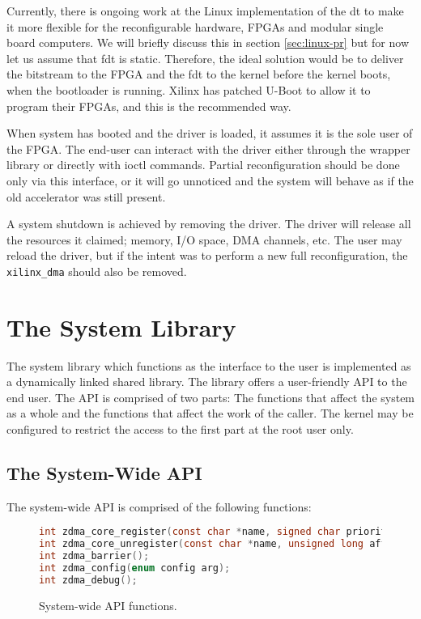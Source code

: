 Currently, there is ongoing work at the Linux implementation of the \gls{dt} to make it more
flexible for the reconfigurable hardware, FPGAs and modular single board computers.
We will briefly discuss this in section \ref{sec:linux-pr} but for now let us assume that \gls{fdt} is static.
Therefore, the ideal solution would be to deliver the bitstream to the FPGA and the \gls{fdt} to the kernel
before the kernel boots, when the bootloader is running. Xilinx has patched U-Boot to allow it to program their FPGAs,
and this is the recommended way.

When system has booted and the driver is loaded, it assumes it is the sole user of the FPGA.
The end-user can interact with the driver either through the wrapper library or directly with ioctl commands.
Partial reconfiguration should be done only via this interface,
or it will go unnoticed and the system will behave as if the old accelerator was still present.

A system shutdown is achieved by removing the driver.
The driver will release all the resources it claimed; memory, I/O space, DMA channels, etc.
The user may reload the driver, but if the intent was to perform a new full reconfiguration,
the \texttt{xilinx\_dma} should also be removed.


\section{The System Library}

The system library which functions as the interface to the user
is implemented as a dynamically linked shared library.
The library offers a user-friendly API to the end user. The API is comprised
of two parts: The functions that affect the system as a whole and the functions
that affect the work of the caller. The kernel may be configured to restrict the access
to the first part at the root user only.


\subsection{The System-Wide API}
\label{sec:sw-api-sys}

The system-wide API is comprised of the following functions:

\begin{figure}[H]
\centering
\begin{lstlisting}[style=basic,language=C]
int zdma_core_register(const char *name, signed char priority, unsigned long affinity);
int zdma_core_unregister(const char *name, unsigned long affinity);
int zdma_barrier();
int zdma_config(enum config arg);
int zdma_debug();
\end{lstlisting}
\caption{System-wide API functions.}
\label{lst:api-system}
\end{figure}

